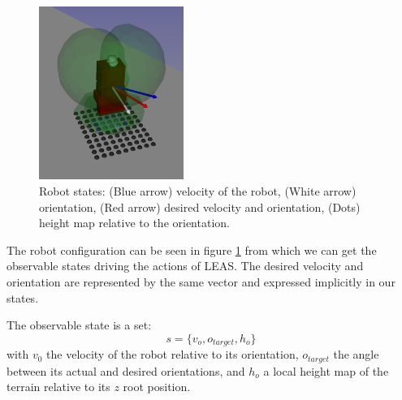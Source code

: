 \begin{figure}
    \centering
    \includegraphics[width=0.42\textwidth]{Figures/Chapter_LEAS/leas_states.png}
    \caption{Robot states: (Blue arrow) velocity of the robot, (White arrow) orientation, (Red arrow) desired velocity and orientation, (Dots) height map relative to the orientation.}
    \label{fig:LEAS_states}
\end{figure}

The robot configuration can be seen in figure \ref{fig:LEAS_states} from which we can get the observable states driving the actions of LEAS. The desired velocity and orientation are represented by the same vector and expressed implicitly in our states.

The observable state is a set: 
\begin{equation}
s=\{v_{o}, o_{target}, h_{o}\}
\end{equation}
with $v_{0}$ the velocity of the robot relative to its orientation, $o_{target}$ the angle between its actual and desired orientations, and $h_{o}$ a local height map of the terrain relative to its $z$ root position.

